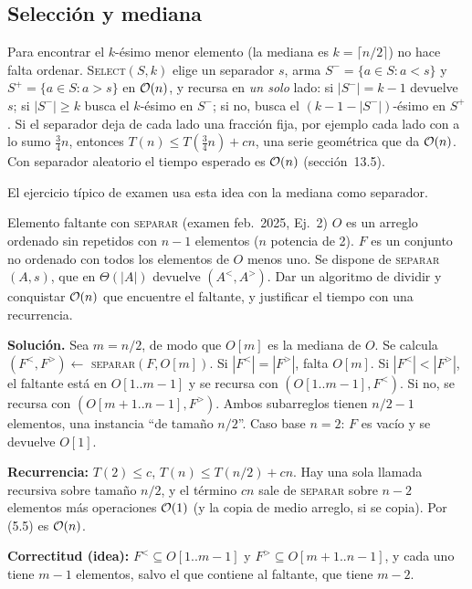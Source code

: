 \subsection{Selección y mediana}

Para encontrar el $k$-ésimo menor elemento (la mediana es $k=\lceil n/2\rceil$) no hace falta ordenar. \textsc{Select}$(S,k)$ elige un separador $s$, arma $S^-=\{a\in S: a<s\}$ y $S^+=\{a\in S:a>s\}$ en $\mathcal{O}(n)$, y recursa en \emph{un solo} lado: si $|S^-|=k-1$ devuelve $s$; si $|S^-|\ge k$ busca el $k$-ésimo en $S^-$; si no, busca el $(k-1-|S^-|)$-ésimo en $S^+$. Si el separador deja de cada lado una fracción fija, por ejemplo cada lado con a lo sumo $\frac34 n$, entonces $T(n)\le T(\frac34 n)+cn$, una serie geométrica que da $\mathcal{O}(n)$. Con separador aleatorio el tiempo esperado es $\mathcal{O}(n)$ (sección~13.5).

El ejercicio típico de examen usa esta idea con la mediana como separador.

\begin{problema}{Elemento faltante con \textsc{separar} (examen feb.~2025, Ej.~2)}
$O$ es un arreglo ordenado sin repetidos con $n-1$ elementos ($n$ potencia de 2). $F$ es un conjunto no ordenado con todos los elementos de $O$ menos uno. Se dispone de \textsc{separar}$(A,s)$, que en $\Theta(|A|)$ devuelve $(A^<,A^>)$. Dar un algoritmo de dividir y conquistar $\mathcal{O}(n)$ que encuentre el faltante, y justificar el tiempo con una recurrencia.

\textbf{Solución.} Sea $m=n/2$, de modo que $O[m]$ es la mediana de $O$. Se calcula $(F^<,F^>)\gets$ \textsc{separar}$(F,O[m])$. Si $|F^<|=|F^>|$, falta $O[m]$. Si $|F^<|<|F^>|$, el faltante está en $O[1..m-1]$ y se recursa con $(O[1..m-1],F^<)$. Si no, se recursa con $(O[m+1..n-1],F^>)$. Ambos subarreglos tienen $n/2-1$ elementos, una instancia ``de tamaño $n/2$''. Caso base $n=2$: $F$ es vacío y se devuelve $O[1]$.

\textbf{Recurrencia:} $T(2)\le c$, $T(n)\le T(n/2)+cn$. Hay una sola llamada recursiva sobre tamaño $n/2$, y el término $cn$ sale de \textsc{separar} sobre $n-2$ elementos más operaciones $\mathcal{O}(1)$ (y la copia de medio arreglo, si se copia). Por (5.5) es $\mathcal{O}(n)$.

\textbf{Correctitud (idea):} $F^<\subseteq O[1..m-1]$ y $F^>\subseteq O[m+1..n-1]$, y cada uno tiene $m-1$ elementos, salvo el que contiene al faltante, que tiene $m-2$.
\end{problema}

